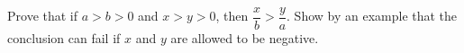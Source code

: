 Prove that if $a>b>0$ and $x>y>0$, then $\dfrac xb>\dfrac ya$. Show by an example that the conclusion can fail if $x$ and $y$ are allowed to be negative.
